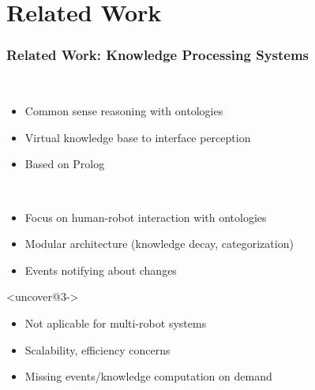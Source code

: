 \section{Related Work}
\begin{frame}
  \frametitle{Related Work: Knowledge Processing Systems}
  \begin{description}[]
  \item[KnowRob]<uncover@1-> \hfill \\
    \begin{itemize}
    \item Common sense reasoning with ontologies
    \item Virtual knowledge base to interface perception
    \item Based on Prolog
    \end{itemize}
  \smallskip
  \item[OpenRobots Ontology (ORO)]<uncover@2-> \hfill \\
    \begin{itemize}
    \item Focus on human-robot interaction with ontologies
    \item Modular architecture (knowledge decay, categorization)
    \item Events notifying about changes
    \end{itemize}
  \end{description}
  \begin{block}{}<uncover@3->
  \begin{itemize}
  \item Not aplicable for multi-robot systems
  \item Scalability, efficiency concerns
  \item Missing events/knowledge computation on demand
  \end{itemize}
  \end{block}
\end{frame}


